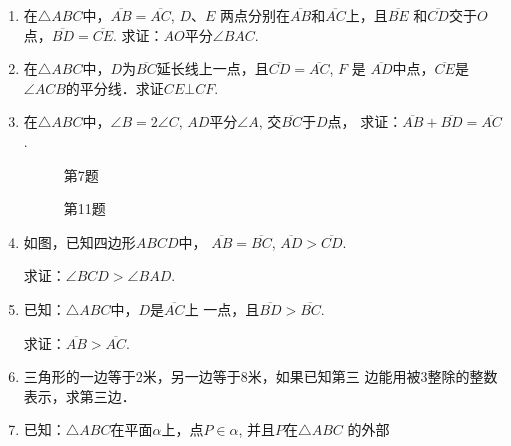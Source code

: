 \begin{enumerate}
\item 在$\triangle ABC$中，$\overline{AB}=\overline{AC}$, $D$、$E$
两点分别在$\overline{AB}$和$\overline{AC}$上，且$\overline{BE}$
和$\overline{CD}$交于$O$点，$\overline{BD}=\overline{CE}$. 求证：$AO$平分$\angle BAC$.
\item 在$\triangle ABC$中，$D$为$\overline{BC}$延长线上一点，且$\overline{CD}=\overline{AC}$, $F$
是
$\overline{AD}$中点，$\overline{CE}$是$\angle ACB$的平分线．求证$CE\bot CF$.

\item 在$\triangle ABC$中，$\angle B=2\angle C$, $AD$平分$\angle A$, 交$\overline{BC}$于$D$点，
求证：$\overline{AB}+\overline{BD}=\overline{AC}$.

\begin{figure}[htp]\centering
    \begin{minipage}[t]{0.48\textwidth}
    \centering
{}
    \caption*{第7题}
    \end{minipage}
    \begin{minipage}[t]{0.48\textwidth}
    \centering
    \caption*{第11题}
    \end{minipage}
    \end{figure}

\item 如图，已知四边形$ABCD$中，
$\overline{AB}=\overline{BC}$, $\overline{AD}>\overline{CD}$. 

求证：$\angle BCD>\angle BAD$.
\item 已知：$\triangle ABC$中，$D$是$\overline{AC}$上
一点，且$\overline{BD}>\overline{BC}$. 

求证：$\overline{AB}>\overline{AC}$.
\item 三角形的一边等于2米，另一边等于8米，如果已知第三
边能用被3整除的整数表示，求第三边．
\item 已知：$\triangle ABC$在平面$\alpha$上，点$P\in\alpha$, 并且$P$在$\triangle ABC$
的外部


\end{enumerate}
